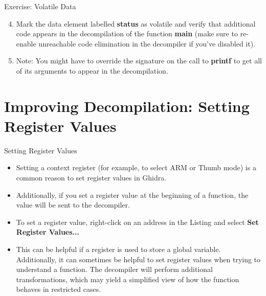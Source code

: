 \documentclass{beamer}
\begin{document}
\begin{frame}
\begin{block}{Exercise: Volatile Data}
\begin{enumerate}
\setcounter{enumi}{3}
\item Mark the data element labelled \textbf{status} as volatile and verify that additional code appears in the decompilation
of the function \textbf{main} (make sure to re-enable unreachable code elimination in the decompiler if you've disabled it).
\item Note: You might have to override the signature on the call to \textbf{printf} to get all of its arguments to appear in the decompilation.
\end{enumerate}
\end{block}
\end{frame}

\section{Improving Decompilation: Setting Register Values}

\begin{frame}
\begin{block}{Setting Register Values}
\begin{itemize}
\item Setting a context register (for example, to select ARM or Thumb mode) is a common reason to set register values in Ghidra.
\item Additionally, if you set a register value at the beginning of a function, the value will be sent to the decompiler.
\item To set a register value, right-click on an address in the Listing and select \textbf{Set Register Values...}
\item This can be helpful if a register is used to store a global variable.  Additionally, it can sometimes be helpful to set register values when trying to
understand a function.  The decompiler will perform additional transformations, which may yield a simplified view of how the function behaves in restricted cases.
\end{itemize}
\end{block}
\end{frame}
\end{document}
